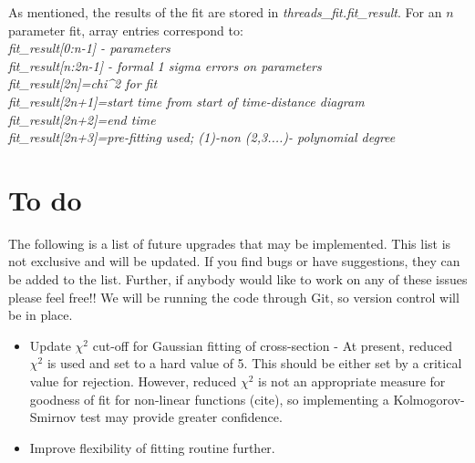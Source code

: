 \documentclass{article}
\begin{document}
As mentioned, the results of the fit are stored in \textit{threads\_fit.fit\_result}. For an $n$ parameter fit, array entries correspond to:\\

\textit{fit\_result[0:n-1] - parameters\\
fit\_result[n:2n-1] - formal 1 sigma errors on parameters\\
fit\_result[2n]=chi\^{}2 for fit\\
fit\_result[2n+1]=start time from start of time-distance diagram\\
fit\_result[2n+2]=end time\\
fit\_result[2n+3]=pre-fitting used; (1)-non (2,3....)- polynomial degree\\
}


\section{To do}
The following is a list of future upgrades that may be implemented. This list is not exclusive and will be updated. If you find bugs or have suggestions, they can be added to 
the list. Further, if anybody would like to work on any of these issues please feel free!! We will be running the code through Git, so version control will be in place.\\

\begin{itemize}
\item Update $\chi^2$ cut-off for Gaussian fitting of cross-section - At present, reduced $\chi^2$ is used and set to a hard value of 5. This should be either set by a critical 
value for rejection. However, reduced $\chi^2$ is not an appropriate measure for goodness of fit for non-linear functions (cite), so implementing a Kolmogorov-Smirnov test 
may provide greater confidence.
\item Improve flexibility of fitting routine further.
\end{itemize}
\end{document}
